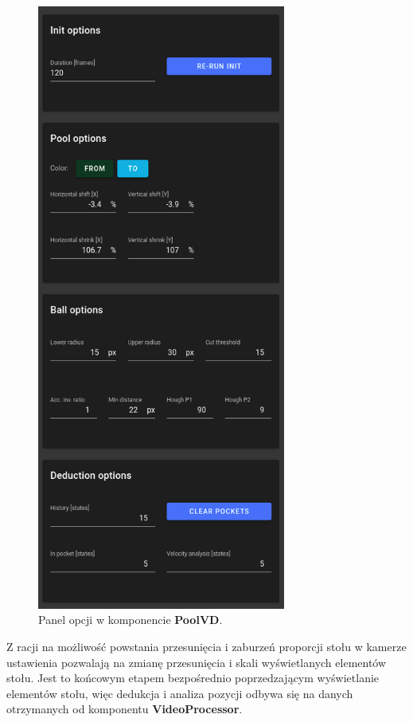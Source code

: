 \documentclass[12pt]{article}
\begin{document}
\begin{figure}[!ht]
    \centering
    \includegraphics[height=20cm]{./images/options.png}
    \caption{Panel opcji w komponencie \textbf{PoolVD}.}
    \label{options}
\end{figure}

Z racji na możliwość powstania przesunięcia i zaburzeń proporcji stołu w kamerze ustawienia pozwalają na zmianę przesunięcia i skali wyświetlanych elementów stołu. Jest to końcowym etapem bezpośrednio poprzedzającym wyświetlanie elementów stołu, więc dedukcja i analiza pozycji odbywa się na danych otrzymanych od komponentu \textbf{VideoProcessor}.
\end{document}
